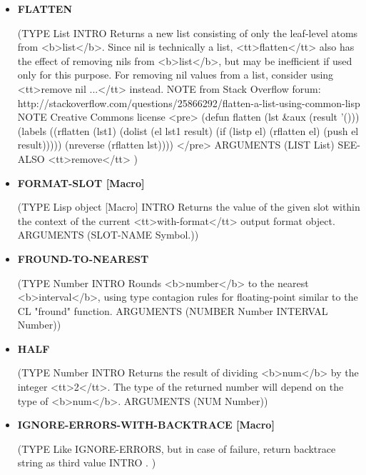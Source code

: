 \documentclass [11pt]{book}
\begin{document}
\begin{itemize}
\item {}
\label{prim:flatten}
\textbf{FLATTEN}

(TYPE List INTRO  Returns a new list consisting of only the leaf-level atoms from <b>list</b>.
Since nil is technically a list, <tt>flatten</tt> also has the effect of removing
nils from <b>list</b>, but may be inefficient if used only for this purpose. For
removing nil values from a list, consider using <tt>remove nil ...</tt> instead.
 NOTE from Stack Overflow forum: http://stackoverflow.com/questions/25866292/flatten-a-list-using-common-lisp 
 NOTE Creative Commons license 
<pre>
 (defun flatten (lst \&aux (result '()))
   (labels ((rflatten (lst1)
              (dolist (el lst1 result)
                (if (listp el)
                  (rflatten el)
                  (push el result)))))
       (nreverse (rflatten lst))))
</pre>
 ARGUMENTS (LIST List) SEE-ALSO <tt>remove</tt> 
)



\item {}
\label{prim:format-slot}
\textbf{FORMAT-SLOT [Macro]}

(TYPE Lisp object [Macro] INTRO  Returns the value of the given slot within the context of the current
<tt>with-format</tt> output format object.
 ARGUMENTS (SLOT-NAME Symbol.))



\item {}
\label{prim:fround-to-nearest}
\textbf{FROUND-TO-NEAREST}

(TYPE Number INTRO  Rounds <b>number</b> to the nearest <b>interval</b>,
using type contagion rules for floating-point similar to the
CL "fround" function.
 ARGUMENTS (NUMBER Number INTERVAL Number))



\item {}
\label{prim:half}
\textbf{HALF}

(TYPE Number INTRO  Returns the result of dividing <b>num</b> by the integer <tt>2</tt>.
The type of the returned number will depend on the type of <b>num</b>.
 ARGUMENTS (NUM Number))



\item {}
\label{prim:ignore-errors-with-backtrace}
\textbf{IGNORE-ERRORS-WITH-BACKTRACE [Macro]}

(TYPE Like IGNORE-ERRORS, but in case of failure, return backtrace string as third value INTRO .
)




\end{itemize}
\end{document}
